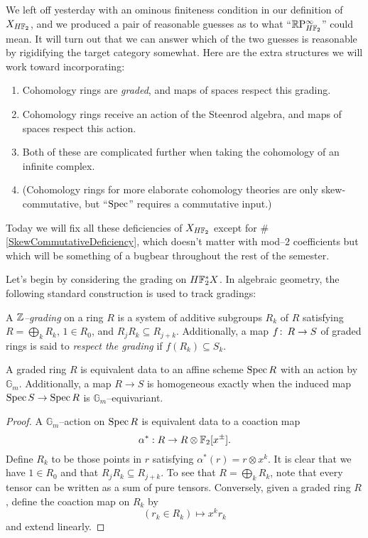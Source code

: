 We left off yesterday with an ominous finiteness condition in our definition of $X_{H\mathbb F_2}$, and we produced a pair of reasonable guesses as to what ``$\mathbb R\mathrm P^\infty_{H\mathbb F_2}$'' could mean.  It will turn out that we can answer which of the two guesses is reasonable by rigidifying the target category somewhat.  Here are the extra structures we will work toward incorporating:
\begin{enumerate}
\item Cohomology rings are \emph{graded}, and maps of spaces respect this grading.
\item Cohomology rings receive an action of the Steenrod algebra, and maps of spaces respect this action.
\item Both of these are complicated further when taking the cohomology of an infinite complex.
\item \label{SkewCommutativeDeficiency} (Cohomology rings for more elaborate cohomology theories are only skew-commutative, but ``$\operatorname{Spec}$'' requires a commutative input.)
\end{enumerate}
Today we will fix all these deficiencies of $X_{H\mathbb F_2}$ except for \#\ref{SkewCommutativeDeficiency}, which doesn't matter with mod--$2$ coefficients but which will be something of a bugbear throughout the rest of the semester.

Let's begin by considering the grading on $H\mathbb F_2^* X$.  In algebraic geometry, the following standard construction is used to track gradings:

\begin{definition}
A \textit{$\mathbb Z$--grading} on a ring $R$ is a system of additive subgroups $R_k$ of $R$ satisfying $R = \bigoplus_k R_k$, $1 \in R_0$, and $R_j R_k \subseteq R_{j+k}$.  Additionally, a map $f\colon\thinspace R \to S$ of graded rings is said to \textit{respect the grading} if $f(R_k) \subseteq S_k$.
\end{definition}

\begin{lemma}\label{GradedAndGmEquivAgree}
A graded ring $R$ is equivalent data to an affine scheme $\operatorname{Spec} R$ with an action by $\mathbb G_m$.  Additionally, a map $R \to S$ is homogeneous exactly when the induced map $\operatorname{Spec} S \to \operatorname{Spec} R$ is $\mathbb G_m$--equivariant.
\end{lemma}
\begin{proof}
A $\mathbb G_m$--action on $\operatorname{Spec} R$ is equivalent data to a coaction map \[\alpha^*: R \to R \otimes \mathbb F_2[x^\pm].\]  Define $R_k$ to be those points in $r$ satisfying $\alpha^*(r) = r \otimes x^k$.  It is clear that we have $1 \in R_0$ and that $R_j R_k \subseteq R_{j+k}$.  To see that $R = \bigoplus_k R_k$, note that every tensor can be written as a sum of pure tensors.  Conversely, given a graded ring $R$, define the coaction map on $R_k$ by \[(r_k \in R_k) \mapsto x^k r_k\] and extend linearly.
\end{proof}

